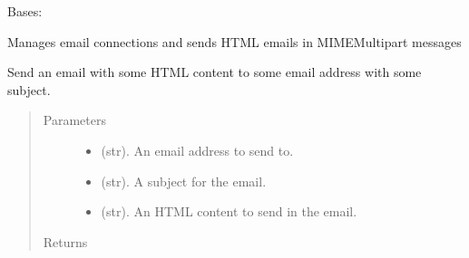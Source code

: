 \documentclass[letterpaper,10pt,english]{sphinxmanual}
\begin{document}
\begin{fulllineitems}
\label{\detokenize{apidoc/utdesign_procurement:utdesign_procurement.emailer.Emailer}}
Bases: 

Manages email connections and sends HTML emails in MIMEMultipart messages

\begin{fulllineitems}
\label{\detokenize{apidoc/utdesign_procurement:utdesign_procurement.emailer.Emailer.emailSend}}
Send an email with some HTML content to some email address with some
subject.
\begin{quote}\begin{description}
\item[{Parameters}] \leavevmode\begin{itemize}
\item {} 
 \textendash{} (str). An email address to send to.

\item {} 
 \textendash{} (str). A subject for the email.

\item {} 
 \textendash{} (str). An HTML content to send in the email.

\end{itemize}

\item[{Returns}] \leavevmode


\end{description}\end{quote}

\end{fulllineitems}


\end{fulllineitems}

\end{document}
